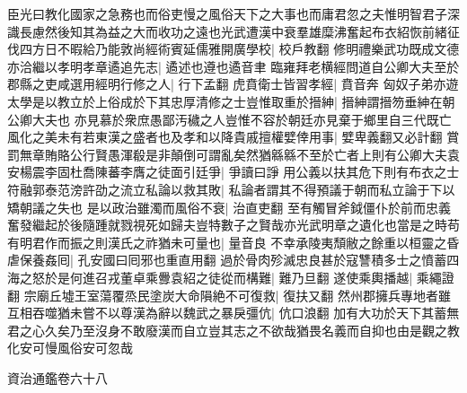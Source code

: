 臣光曰教化國家之急務也而俗吏慢之風俗天下之大事也而庸君忽之夫惟明智君子深識長慮然後知其為益之大而收功之遠也光武遭漢中衰羣雄糜沸奮起布衣紹恢前緒征伐四方日不暇給乃能敦尚經術賓延儒雅開廣學校|{
	校戶教翻}
修明禮樂武功既成文德亦洽繼以孝明孝章遹追先志|{
	遹述也遵也遹音聿}
臨雍拜老横經問道自公卿大夫至於郡縣之吏咸選用經明行修之人|{
	行下孟翻}
虎賁衛士皆習孝經|{
	賁音奔}
匈奴子弟亦遊太學是以教立於上俗成於下其忠厚清修之士豈惟取重於搢紳|{
	搢紳謂搢笏垂紳在朝公卿大夫也}
亦見慕於衆庶愚鄙汚穢之人豈惟不容於朝廷亦見棄于鄉里自三代既亡風化之美未有若東漢之盛者也及孝和以降貴戚擅權嬖倖用事|{
	嬖卑義翻又必計翻}
賞罰無章賄賂公行賢愚渾殽是非顛倒可謂亂矣然猶緜緜不至於亡者上則有公卿大夫袁安楊震李固杜喬陳蕃李膺之徒面引廷爭|{
	爭讀曰諍}
用公義以扶其危下則有布衣之士符融郭泰范滂許劭之流立私論以救其敗|{
	私論者謂其不得預議于朝而私立論于下以矯朝議之失也}
是以政治雖濁而風俗不衰|{
	治直吏翻}
至有觸冒斧鉞僵仆於前而忠義奮發繼起於後隨踵就戮視死如歸夫豈特數子之賢哉亦光武明章之遺化也當是之時苟有明君作而振之則漢氏之祚猶未可量也|{
	量音良}
不幸承陵夷頹敝之餘重以桓靈之昏虐保養姦囘|{
	孔安國曰囘邪也重直用翻}
過於骨肉殄滅忠良甚於寇讐積多士之憤蓄四海之怒於是何進召戎董卓乘釁袁紹之徒從而構難|{
	難乃旦翻}
遂使乘輿播越|{
	乘繩證翻}
宗廟丘墟王室蕩覆烝民塗炭大命隕絶不可復救|{
	復扶又翻}
然州郡擁兵專地者雖互相吞噬猶未嘗不以尊漢為辭以魏武之暴戾彊伉|{
	伉口浪翻}
加有大功於天下其蓄無君之心久矣乃至沒身不敢廢漢而自立豈其志之不欲哉猶畏名義而自抑也由是觀之教化安可慢風俗安可忽哉

資治通鑑卷六十八
